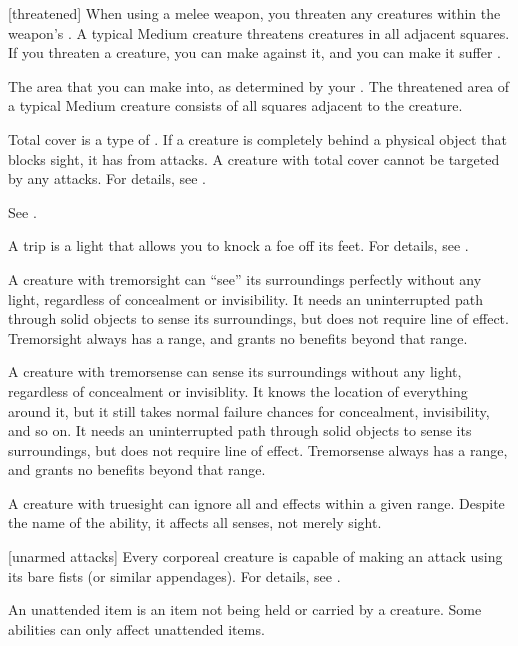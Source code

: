 [threatened] When using a melee weapon, you threaten any creatures within the weapon's .
A typical Medium creature threatens creatures in all adjacent squares.
If you threaten a creature, you can make  against it, and you can make it suffer .

 The area that you can make  into, as determined by your .
The threatened area of a typical Medium creature consists of all squares adjacent to the creature.

 Total cover is a type of .
If a creature is completely behind a physical object that blocks sight, it has  from attacks.
A creature with total cover cannot be targeted by any attacks.
For details, see .

 See .

 A trip is a light  that allows you to knock a foe off its feet.
For details, see .

 A creature with tremorsight can ``see'' its surroundings perfectly without any light, regardless of concealment or invisibility.
It needs an uninterrupted path through solid objects to sense its surroundings, but does not require line of effect.
Tremorsight always has a range, and grants no benefits beyond that range.

 A creature with tremorsense can sense its surroundings without any light, regardless of concealment or invisiblity.
It knows the location of everything around it, but it still takes normal failure chances for concealment, invisibility, and so on.
It needs an uninterrupted path through solid objects to sense its surroundings, but does not require line of effect.
Tremorsense always has a range, and grants no benefits beyond that range.

 A creature with truesight can ignore all  and  effects within a given range.
Despite the name of the ability, it affects all senses, not merely sight.

[unarmed attacks] Every corporeal creature is capable of making an attack using its bare fists (or similar appendages).
For details, see .

 An unattended item is an item not being held or carried by a creature.
Some abilities can only affect unattended items.

